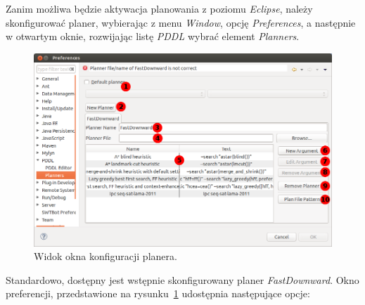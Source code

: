 Zanim możliwa będzie aktywacja planowania z poziomu \emph{Eclipse}, należy skonfigurować planer, wybierając z menu \emph{Window}, opcję \emph{Preferences}, a następnie w otwartym oknie, rozwijając listę \emph{PDDL} wybrać element \emph{Planners}.

\begin{figure}[h!]
    \centering
    \includegraphics[width=\textwidth]{img/planner_preferences_window}
    \caption{Widok okna konfiguracji planera.}
    \label{fig:preferences_window}
\end{figure}
Standardowo, dostępny jest wstępnie skonfigurowany planer \emph{FastDownward}. Okno preferencji, przedstawione na rysunku~\ref{fig:preferences_window}  udostępnia następujące opcje:

